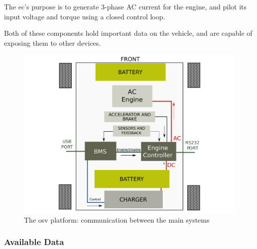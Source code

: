 \documentclass[runningheads]{llncs}
\begin{document}
The \gls{ec}'s purpose is to generate 3-phase AC current for the engine, and
pilot its input voltage and torque
 
using a closed control loop.


Both of these components hold important data on the vehicle, and are capable of
exposing them to other devices.



\begin{figure}[!h]
\includegraphics[width=\textwidth] {OSV.pdf}




\caption{The \gls{osv} platform: communication between the main systems}
\label{fig1}
\end{figure}

\subsubsection{Available Data}
	
\end{document}
